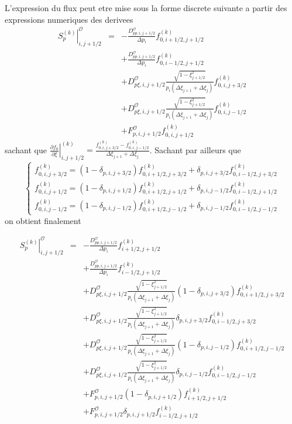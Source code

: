 L'expression du flux peut etre mise sous la forme discrete suivante
a partir des expressions numeriques des derivees \begin{eqnarray*}
\left.S_{p}^{\left(k\right)}\right|_{i,j+1/2}^{\mathcal{O}} & = & -\frac{D_{pp,i,j+1/2}^{\mathcal{O}}}{\Delta p_{i}}f_{0,i+1/2,j+1/2}^{(k)}\\
 &  & +\frac{D_{pp,i,j+1/2}^{\mathcal{O}}}{\Delta p_{i}}f_{0,i-1/2,j+1/2}^{(k)}\\
 &  & +D_{p\xi,i,j+1/2}^{\mathcal{O}}\frac{\sqrt{1-\xi_{j+1/2}^{2}}}{p_{i}\left(\Delta\xi_{j+1}+\Delta\xi_{j}\right)}f_{0,i,j+3/2}^{(k)}\\
 &  & +D_{p\xi,i,j+1/2}^{\mathcal{O}}\frac{\sqrt{1-\xi_{j+1/2}^{2}}}{p_{i}\left(\Delta\xi_{j+1}+\Delta\xi_{j}\right)}f_{0,i,j-1/2}^{(k)}\\
 &  & +F_{p,i,j+1/2}^{\mathcal{O}}f_{0,i,j+1/2}^{(k)}\end{eqnarray*}
 sachant que $\left.\frac{\partial f_{0}}{\partial\xi}\right|_{i,j+1/2}^{(k)}=\frac{f_{0,i,j+3/2}^{(k)}-f_{0,i,j-1/2}^{(k)}}{\Delta\xi_{j+1}+\Delta\xi_{j}}$.
Sachant par ailleurs que \[
\left\{ \begin{array}{l}
f_{0,i,j+3/2}^{(k)}=\left(1-\delta_{p,i,j+3/2}\right)f_{0,i+1/2,j+3/2}^{(k)}+\delta_{p,i,j+3/2}f_{0,i-1/2,j+3/2}^{(k)}\\
f_{0,i,j+1/2}^{(k)}=\left(1-\delta_{p,i,j+1/2}\right)f_{0,i+1/2,j+1/2}^{(k)}+\delta_{p,i,j-1/2}f_{0,i-1/2,j+1/2}^{(k)}\\
f_{0,i,j-1/2}^{(k)}=\left(1-\delta_{p,i,j-1/2}\right)f_{0,i+1/2,j-1/2}^{(k)}+\delta_{p,i,j-1/2}f_{0,i-1/2,j-1/2}^{(k)}\end{array}\right.\]
 on obtient finalement

\begin{eqnarray*}
\left.S_{p}^{\left(k\right)}\right|_{i,j+1/2}^{\mathcal{O}} & = & -\frac{D_{pp,i,j+1/2}^{\mathcal{O}}}{\Delta p_{i}}f_{i+1/2,j+1/2}^{(k)}\\
 &  & +\frac{D_{pp,i,j+1/2}^{\mathcal{O}}}{\Delta p_{i}}f_{i-1/2,j+1/2}^{(k)}\\
 &  & +D_{p\xi,i,j+1/2}^{\mathcal{O}}\frac{\sqrt{1-\xi_{j+1/2}^{2}}}{p_{i}\left(\Delta\xi_{j+1}+\Delta\xi_{j}\right)}\left(1-\delta_{p,i,j+3/2}\right)f_{0,i+1/2,j+3/2}^{(k)}\\
 &  & +D_{p\xi,i,j+1/2}^{\mathcal{O}}\frac{\sqrt{1-\xi_{j+1/2}^{2}}}{p_{i}\left(\Delta\xi_{j+1}+\Delta\xi_{j}\right)}\delta_{p,i,j+3/2}f_{0,i-1/2,j+3/2}^{(k)}\\
 &  & +D_{p\xi,i,j+1/2}^{\mathcal{O}}\frac{\sqrt{1-\xi_{j+1/2}^{2}}}{p_{i}\left(\Delta\xi_{j+1}+\Delta\xi_{j}\right)}\left(1-\delta_{p,i,j-1/2}\right)f_{0,i+1/2,j-1/2}^{(k)}\\
 &  & +D_{p\xi,i,j+1/2}^{\mathcal{O}}\frac{\sqrt{1-\xi_{j+1/2}^{2}}}{p_{i}\left(\Delta\xi_{j+1}+\Delta\xi_{j}\right)}\delta_{p,i,j-1/2}f_{0,i-1/2,j-1/2}^{(k)}\\
 &  & +F_{p,i,j+1/2}^{\mathcal{O}}\left(1-\delta_{p,i,j+1/2}\right)f_{i+1/2,j+1/2}^{(k)}\\
 &  & +F_{p,i,j+1/2}^{\mathcal{O}}\delta_{p,i,j+1/2}f_{i-1/2,j+1/2}^{(k)}\end{eqnarray*}



